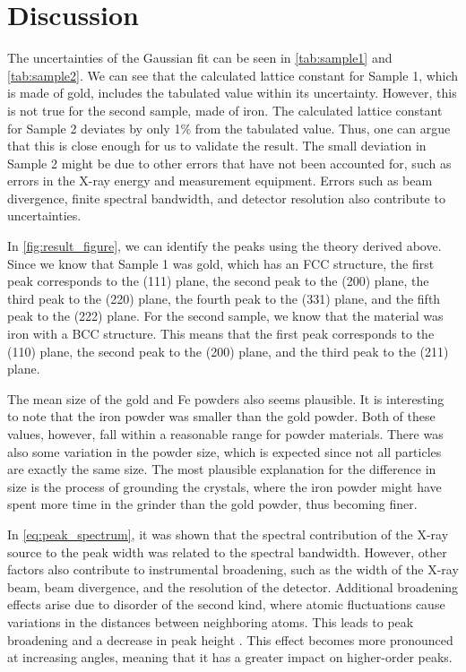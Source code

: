\section{Discussion}
The uncertainties of the Gaussian fit can be seen in \autoref{tab:sample1} and \autoref{tab:sample2}. We can see that the calculated lattice constant for Sample 1, which is made of gold, includes the tabulated value within its uncertainty. However, this is not true for the second sample, made of iron. The calculated lattice constant for Sample 2 deviates by only 1\% from the tabulated value. Thus, one can argue that this is close enough for us to validate the result. The small deviation in Sample 2 might be due to other errors that have not been accounted for, such as errors in the X-ray energy and measurement equipment. Errors such as beam divergence, finite spectral bandwidth, and detector resolution also contribute to uncertainties.


In \autoref{fig:result_figure}, we can identify the peaks using the theory derived above. Since we know that Sample 1 was gold, which has an FCC structure, the first peak corresponds to the (111) plane, the second peak to the (200) plane, the third peak to the (220) plane, the fourth peak to the (331) plane, and the fifth peak to the (222) plane. For the second sample, we know that the material was iron with a BCC structure. This means that the first peak corresponds to the (110) plane, the second peak to the (200) plane, and the third peak to the (211) plane.

The mean size of the gold and Fe powders also seems plausible. It is interesting to note that the iron powder was smaller than the gold powder. Both of these values, however, fall within a reasonable range for powder materials. There was also some variation in the powder size, which is expected since not all particles are exactly the same size. The most plausible explanation for the difference in size is the process of grounding the crystals, where the iron powder might have spent more time in the grinder than the gold powder, thus becoming finer.

In \autoref{eq:peak_spectrum}, it was shown that the spectral contribution of the X-ray source to the peak width was related to the spectral bandwidth. However, other factors also contribute to instrumental broadening, such as the width of the X-ray beam, beam divergence, and the resolution of the detector. Additional broadening effects arise due to disorder of the second kind, where atomic fluctuations cause variations in the distances between neighboring atoms. This leads to peak broadening and a decrease in peak height \cite{guinier1963xray}. This effect becomes more pronounced at increasing angles, meaning that it has a greater impact on higher-order peaks.
